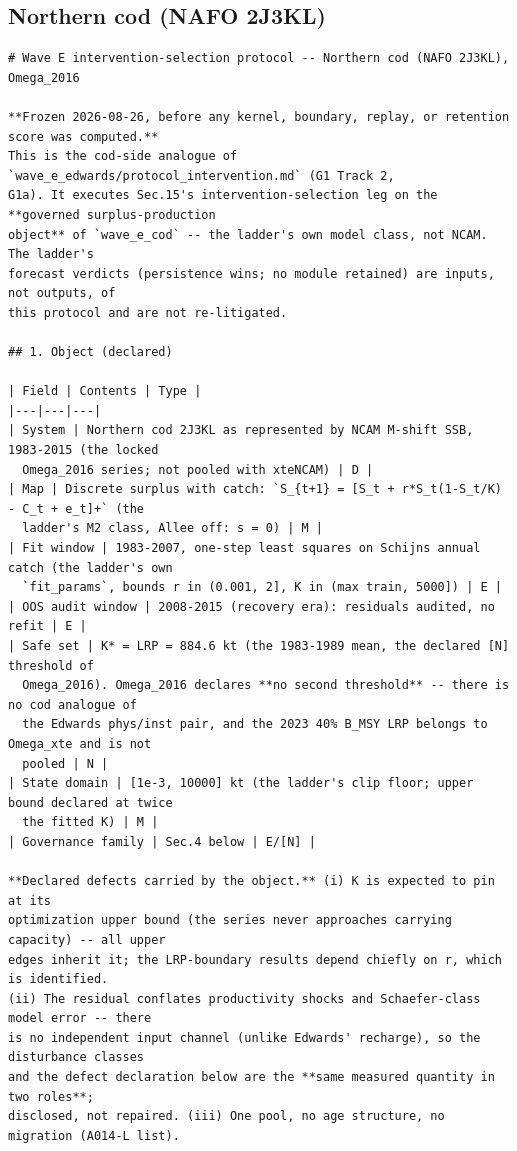 \documentclass[11pt,a4paper]{article}
\begin{document}
\subsection{Northern cod (NAFO 2J3KL)}
\begin{footnotesize}\begin{verbatim}
# Wave E intervention-selection protocol -- Northern cod (NAFO 2J3KL), Omega_2016

**Frozen 2026-08-26, before any kernel, boundary, replay, or retention score was computed.**
This is the cod-side analogue of `wave_e_edwards/protocol_intervention.md` (G1 Track 2,
G1a). It executes Sec.15's intervention-selection leg on the **governed surplus-production
object** of `wave_e_cod` -- the ladder's own model class, not NCAM. The ladder's
forecast verdicts (persistence wins; no module retained) are inputs, not outputs, of
this protocol and are not re-litigated.

## 1. Object (declared)

| Field | Contents | Type |
|---|---|---|
| System | Northern cod 2J3KL as represented by NCAM M-shift SSB, 1983-2015 (the locked
  Omega_2016 series; not pooled with xteNCAM) | D |
| Map | Discrete surplus with catch: `S_{t+1} = [S_t + r*S_t(1-S_t/K) - C_t + e_t]+` (the
  ladder's M2 class, Allee off: s = 0) | M |
| Fit window | 1983-2007, one-step least squares on Schijns annual catch (the ladder's own
  `fit_params`, bounds r in (0.001, 2], K in (max train, 5000]) | E |
| OOS audit window | 2008-2015 (recovery era): residuals audited, no refit | E |
| Safe set | K* = LRP = 884.6 kt (the 1983-1989 mean, the declared [N] threshold of
  Omega_2016). Omega_2016 declares **no second threshold** -- there is no cod analogue of
  the Edwards phys/inst pair, and the 2023 40% B_MSY LRP belongs to Omega_xte and is not
  pooled | N |
| State domain | [1e-3, 10000] kt (the ladder's clip floor; upper bound declared at twice
  the fitted K) | M |
| Governance family | Sec.4 below | E/[N] |

**Declared defects carried by the object.** (i) K is expected to pin at its
optimization upper bound (the series never approaches carrying capacity) -- all upper
edges inherit it; the LRP-boundary results depend chiefly on r, which is identified.
(ii) The residual conflates productivity shocks and Schaefer-class model error -- there
is no independent input channel (unlike Edwards' recharge), so the disturbance classes
and the defect declaration below are the **same measured quantity in two roles**;
disclosed, not repaired. (iii) One pool, no age structure, no migration (A014-L list).


\end{verbatim}
\end{footnotesize}
\end{document}
